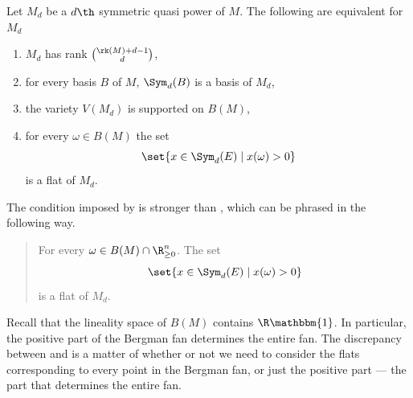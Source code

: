 \begin{proposition}\label{prop:symprodCharacterisations}
Let $M_d$ be a $d\th$ symmetric quasi power of $M$. The following are equivalent for $M_d$
\begin{enumerate}[label=(\roman*),]
    \item\label{prop:symprodCharacterisations.rk} $M_d$ has rank $\binom{\rk(M)+d-1}{d}$,
    \item\label{prop:symprodCharacterisations.bases} for every basis $B$ of $M$, $\Sym_d(B)$ is a basis of $M_d$,
    \item\label{prop:symprodCharacterisations.bf} the variety $V(M_d)$ is supported on $B(M)$,
    \item\label{prop:symprodCharacterisations.flats} for every $\omega\in B(M)$ the set
    $$\set{x\in \Sym_d(E)\mid x(\omega)>0}$$
    is a flat of $M_d$.
\end{enumerate}
\end{proposition}
The condition imposed by  is stronger than , which can be phrased in the following way.
\begin{quote}
    For every $\omega\in B(M)\cap \R^n_{\geq 0}$. The set
    $$\set{x\in \Sym_d(E)\mid x(\omega)>0}$$
    is a flat of $M_d$.
\end{quote}
Recall that the lineality space of $B(M)$ contains $\R \mathbbm{1}$. In particular, the positive part of the Bergman fan determines the entire fan. The discrepancy between  and  is a matter of whether or not we need to consider the flats corresponding to every point in the Bergman fan, or just the positive part --- the part that determines the entire fan.

